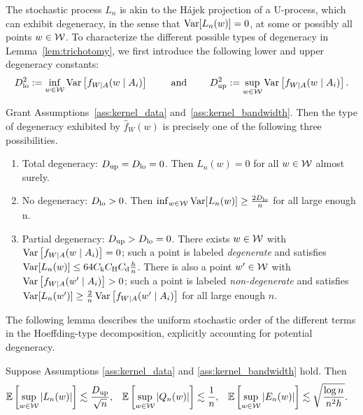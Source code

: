 The stochastic process $L_n$ is akin to the H{\'a}jek projection of a U-process,
which can exhibit degeneracy, in the sense that $\operatorname{Var}[L_n(w)] = 0$, at some
or possibly all points $w \in \mathcal{W}$.
To characterize the different possible types of degeneracy
in Lemma~\ref{lem:trichotomy},
we first introduce the following lower and upper degeneracy constants:
%
\begin{align*}
  D_{\textup{lo}}^2 := \inf_{w \in \mathcal{W}} \operatorname{Var}\left[f_{W \mid A}(w \mid A_i)\right]
  \qquad \text{ and } \qquad
  D_{\textup{up}}^2 := \sup_{w \in \mathcal{W}} \operatorname{Var}\left[f_{W \mid A}(w \mid A_i)\right].
\end{align*}
%
\begin{lemma}
  \label{lem:trichotomy}

  Grant Assumptions~\ref{ass:kernel_data}
  and~\ref{ass:kernel_bandwidth}.
  Then the type of degeneracy exhibited by $\hat f_W(w)$
  is precisely one of the following three possibilities.
  \begin{enumerate}[label=(\roman*)]

    \item Total degeneracy:
      $D_{\textup{up}} = D_{\textup{lo}} = 0$.
      Then
      $L_n(w) = 0$ for all $w \in \mathcal{W}$
      almost surely.

    \item No degeneracy:
      $D_{\textup{lo}} > 0$. Then
      $\inf_{w \in \mathcal{W}} \operatorname{Var}[L_n(w)] \geq \frac{2 D_{\textup{lo}}}{n}$
      for all large enough n.

    \item Partial degeneracy:
      $D_{\textup{up}} > D_{\textup{lo}} = 0$.
      There exists $w \in \mathcal{W}$ with
      $\operatorname{Var}\left[f_{W \mid A}(w \mid A_i)\right] = 0$;
      such a point is labeled \emph{degenerate} and satisfies
      $\operatorname{Var}[L_n(w)] \leq 64 C_{\mathrm{k}} C_{\mathrm{H}} C_{\mathrm{d}} \frac{h}{n}$.
      There is also a point $w' \in \mathcal{W}$ with
      $\operatorname{Var}\left[f_{W \mid A}(w' \mid A_i)\right] > 0$;
      such a point is labeled \emph{non-degenerate} and satisfies
      $\operatorname{Var}[L_n(w')] \geq
      \frac{2}{n} \operatorname{Var}\left[f_{W \mid A}(w' \mid A_i)\right]$
      for all large enough $n$.

  \end{enumerate}

\end{lemma}

The following lemma describes the uniform stochastic order of
the different terms in the Hoeffding-type decomposition,
explicitly accounting for potential degeneracy.

\begin{lemma}
  \label{lem:uniform_concentration}

  Suppose Assumptions \ref{ass:kernel_data} and
  \ref{ass:kernel_bandwidth} hold. Then
  \begin{align*}
    \mathbb{E}\left[ \sup_{w \in \mathcal{W}} |L_n(w)| \right]
    &\lesssim
    \frac{D_{\textup{up}}}{\sqrt n},
    &\mathbb{E}\left[ \sup_{w \in \mathcal{W}} |Q_n(w)| \right]
    &\lesssim
    \frac{1}{n},
    &\mathbb{E}\left[ \sup_{w \in \mathcal{W}} |E_n(w)| \right]
    &\lesssim
    \sqrt{\frac{\log n}{n^2h}}.
  \end{align*}
\end{lemma}


